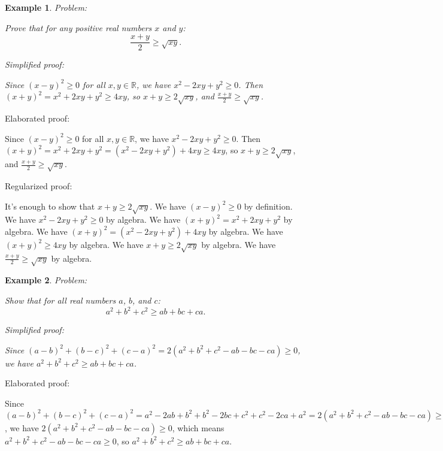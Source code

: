 \documentclass{article}
\newtheorem{example}{Example}
\begin{document}
\begin{example}
Problem:
\begin{tcolorbox}[colback=yellow!10, width=\linewidth]
Prove that for any positive real numbers $x$ and $y$:
    $$\frac{x+y}{2} \geq \sqrt{xy}.$$
\end{tcolorbox}

Simplified proof:
\begin{tcolorbox}[colback=blue!10, width=\linewidth]
Since $(x-y)^2 \ge 0$ for all $x, y \in \mathbb{R}$, we have $x^2 - 2xy + y^2 \ge 0$. Then $(x+y)^2 = x^2 + 2xy + y^2 \ge 4xy$, so $x+y \ge 2\sqrt{xy}$, and $\frac{x+y}{2} \ge \sqrt{xy}$.
\end{tcolorbox}
\end{example}

Elaborated proof:
\begin{tcolorbox}[colback=green!10, width=\linewidth]
Since $(x-y)^2 \ge 0$ for all $x, y \in \mathbb{R}$, we have $x^2 - 2xy + y^2 \ge 0$. Then $(x+y)^2 = x^2 + 2xy + y^2 = (x^2 - 2xy + y^2) + 4xy \ge 4xy$, so $x+y \ge 2\sqrt{xy}$, and $\frac{x+y}{2} \ge \sqrt{xy}$.
\end{tcolorbox}

Regularized proof:
\begin{tcolorbox}[colback=red!10, width=\linewidth]
It's enough to show that $x+y \ge 2\sqrt{xy}$. We have $(x-y)^2 \ge 0$ by definition. We have $x^2 - 2xy + y^2 \ge 0$ by algebra. We have $(x+y)^2 = x^2 + 2xy + y^2$ by algebra. We have $(x+y)^2 = (x^2 - 2xy + y^2) + 4xy$ by algebra. We have $(x+y)^2 \ge 4xy$ by algebra. We have $x+y \ge 2\sqrt{xy}$ by algebra. We have $\frac{x+y}{2} \ge \sqrt{xy}$ by algebra.
\end{tcolorbox}



\begin{example}
Problem:
\begin{tcolorbox}[colback=yellow!10, width=\linewidth]
Show that for all real numbers $a$, $b$, and $c$:
    $$a^2 + b^2 + c^2 \geq ab + bc + ca.$$
\end{tcolorbox}

Simplified proof:
\begin{tcolorbox}[colback=blue!10, width=\linewidth]
Since $(a-b)^2+(b-c)^2+(c-a)^2 = 2(a^2+b^2+c^2-ab-bc-ca) \ge 0$, we have $a^2+b^2+c^2 \ge ab+bc+ca$.
\end{tcolorbox}
\end{example}

Elaborated proof:
\begin{tcolorbox}[colback=green!10, width=\linewidth]
Since $(a-b)^2+(b-c)^2+(c-a)^2 = a^2 - 2ab + b^2 + b^2 - 2bc + c^2 + c^2 - 2ca + a^2 = 2(a^2+b^2+c^2-ab-bc-ca) \ge 0$, we have $2(a^2+b^2+c^2-ab-bc-ca) \ge 0$, which means $a^2+b^2+c^2-ab-bc-ca \ge 0$, so $a^2+b^2+c^2 \ge ab+bc+ca$.
\end{tcolorbox}
\end{document}
